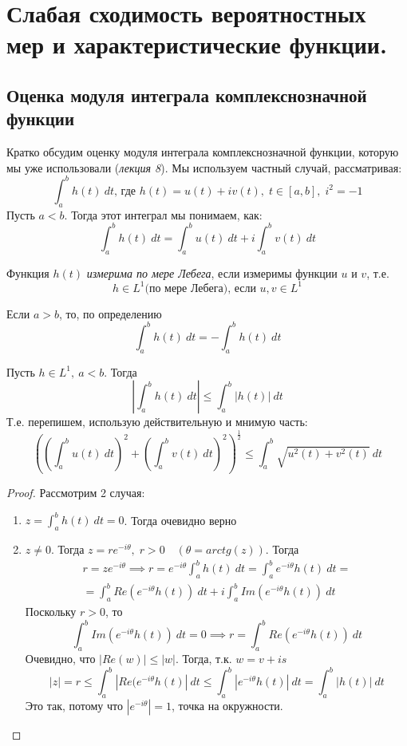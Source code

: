 \documentclass[a4paper,reqno]{amsart}
\begin{document}
\section{Слабая сходимость вероятностных мер и характеристические функции.}
\subsection{Оценка модуля интеграла комплекснозначной функции}
Кратко обсудим оценку модуля интеграла комплекснозначной функции, которую мы уже использовали (\emph{лекция 8}). Мы используем частный случай, рассматривая:
$$\int_a^b h(t) \: dt\mbox{, где } h(t) = u(t) + iv(t),\; t \in [a, b],\; i^2 = -1$$
Пусть $a < b$. Тогда этот интеграл мы понимаем, как:
$$\int_a^b h(t) \:dt = \int_a^b u(t) \:dt + i\int_a^b v(t) \:dt$$
\begin{definition} \label{lect12:def1}
    Функция $h(t)$ \emph{измерима по мере Лебега}, если измеримы функции $u$ и $v$, т.е. 
    $$h \in L^1 \mbox{(по мере Лебега), если } u, v \in L^1$$
\end{definition}
\begin{nb}
    Если $a > b$, то, по определению
$$\int_a^b h(t) \:dt = -\int_a^b h(t)\: dt$$
\end{nb}
\begin{lemma} \label{lect12:lem1}
    Пусть $h\in L^1, \:a < b$. Тогда
    $$\left| \int_a^b h(t) \:dt\right| \leqslant \int_a^b |h(t)| \:dt$$
    Т.е. перепишем, использую действительную и мнимую часть:
    $$\left(\left(\int_a^b u(t)\: dt\right)^2 + \left(\int_a^b v(t) \:dt\right) ^2\right)^{\frac{1}{2}} \leqslant \int_a^b \sqrt{u^2(t) + v^2(t)} \: dt$$
\end{lemma}
\begin{proof}
    Рассмотрим 2 случая:
    \begin{enumerate}
        \item $z = \int_a^b h(t) \: dt = 0$. Тогда очевидно верно
        \item $z \ne 0$. Тогда $z = re^{-i\theta},\; r >0 \quad(\theta = arctg(z))$. Тогда
         \begin{multline*}
            r = ze^{-i\theta} \implies r = e^{-i\theta}\int_a^b h(t) \:dt = \int_a^b e^{-i\theta} h(t) \: dt = \\=\int_a^b Re(e^{-i\theta} h(t)) \: dt + i \int_a^b Im(e^{-i\theta} h(t)) \: dt 
        \end{multline*}
    Поскольку $r>0$, то
    $$\int_a^b Im(e^{-i\theta} h(t)) \: dt =0 \implies r = \int_a^b Re(e^{-i\theta} h(t)) \: dt $$
    Очевидно, что $\left| Re(w)\right| \leqslant |w|$. Тогда, т.к. $w = v + is$
    $$|z| = r \leqslant \int_a^b \left|Re(e^{-i\theta} h(t) \right| \:dt \leqslant \int_a^b |e^{-i\theta} h(t)| \:dt = \int_a^b |h(t)| \:dt$$
    Это так, потому что $|e^{-i\theta}| = 1$, точка на окружности.
    \end{enumerate}
\end{proof}
\end{document}
